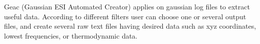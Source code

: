 Geac (Gaussian ESI Automated Creator) applies on gaussian log files to extract useful data. According to different filters user can choose one or several output files, and create several raw text files having desired data such as xyz coordinates, lowest frequencies, or thermodynamic data.